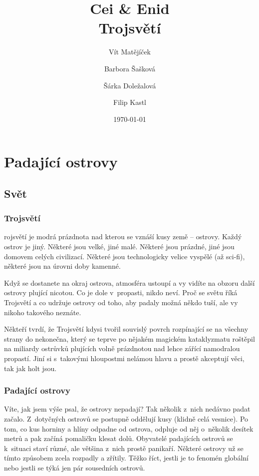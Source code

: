 \documentclass[a4paper,twocolumn,openany,nodeprecatedcode, justified]{dndbook}
\title{
	Cei \& Enid\\
	\LARGE Trojsvětí
}
\author{Vít Matějíček \and Barbora Šašková \and Šárka Doležalová \and Filip Kastl}
\date{\today}
\begin{document}
	\DndSetThemeColor[PhbLightCyan]
	
	\frontmatter
	
	\maketitle
	
	\tableofcontents
	
	\mainmatter%
	
	\part{Padající ostrovy}
	\chapter{Svět}
	\section{Trojsvětí}
	rojsvětí je modrá prázdnota nad kterou se vznáší kusy země -- ostrovy. Každý
	ostrov je jiný. Některé jsou velké, jiné malé. Některé jsou prázdné, jiné jsou
	domovem celých civilizací. Některé jsou technologicky velice vyspělé (až sci-fi),
	některé jsou na úrovni doby kamenné.
	
	Když se dostanete na okraj ostrova, atmosféra ustoupí a vy vidíte na obzoru
	další ostrovy plující nicotou. Co je dole v~propasti, nikdo neví. Proč se světu
	říká Trojsvětí a co udržuje ostrovy od toho, aby padaly možná někdo tuší, ale
	vy nikoho takového neznáte.
	
	Někteří tvrdí, že Trojsvětí kdysi tvořil souvislý povrch rozpínající se na všechny strany do nekonečna, který se teprve po nějakém magickém kataklyzmatu roštěpil na miliardy ostrůvků plujících volně prázdnotou nad lehce zářící namodralou propastí. Jiní si s~takovými hloupostmi nelámou hlavu a prostě akceptují věci, tak jak holt jsou.
	
	\section{Padající ostrovy}
	Víte, jak jsem výše psal, že ostrovy nepadají? Tak několik z~nich nedávno padat
	začalo. Z~dotyčných ostrovů se postupně oddělují kusy (klidně celá vesnice). Po
	tom, co kus horniny a hlíny odpadne od ostrova, odpluje od něj o~několik desítek
	metrů a pak začíná pomaličku klesat dolů. Obyvatelé padajících ostrovů se
k~situaci staví různé, ale většina z~nich prostě panikaří. Některé ostrovy už se
	tímto způsobem zcela rozpadly a zřítily. Těžko říct, jestli je to fenomén globální
	nebo jestli se týká jen pár sousedních ostrovů.
	
\end{document}
